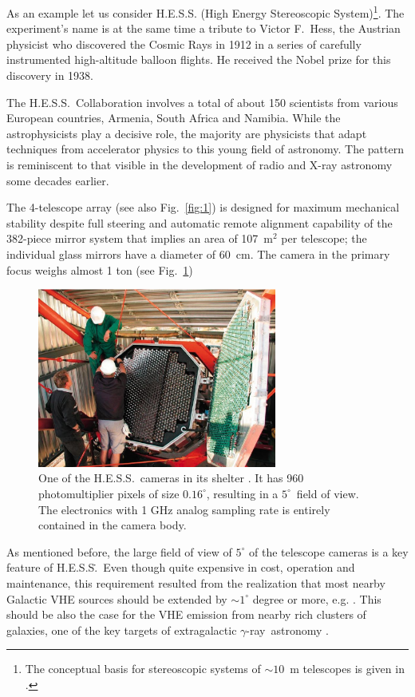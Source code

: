 \documentclass{svjour3x}                     %
\newcommand{\gr}{$\gamma$-ray}
\newcommand{\hess}{H.E.S.S.}
\begin{document}
As an example let us consider H.E.S.S. (High Energy Stereoscopic
System)\footnote{The conceptual basis for stereoscopic systems of $\sim 10$~m
  telescopes is given in \cite{AHKV97a,AHKV97b}.}. The experiment's name is at
the same time a tribute to Victor F.\ Hess, the Austrian physicist who
discovered the Cosmic Rays in 1912 in a series of carefully instrumented
high-altitude balloon flights. He received the Nobel prize for this discovery
in 1938.

The H.E.S.S.\ Collaboration involves a total of about 150 scientists from
various European countries, Armenia, South Africa and Namibia. While the
astrophysicists play a decisive role, the majority are physicists that adapt
techniques from accelerator physics to this young field of astronomy. The
pattern is reminiscent to that visible in the development of radio and X-ray
astronomy some decades earlier.

The 4-telescope array (see also Fig.~\ref{fig:1}) is designed for maximum
mechanical stability despite full steering and automatic remote alignment
capability of the 382-piece mirror system that implies an area of 
107~m$^2$ per telescope; the individual glass mirrors have a diameter of 
60~cm. The camera in the primary focus weighs almost 1 ton (see
Fig.~\ref{fig:12})

\begin{figure}\sidecaption
  \includegraphics[width=0.7\textwidth]{HESS_camera_x.eps}
  \caption[One of the \hess\ cameras]{One of the \hess\ cameras in its shelter \cite{hesspic}. It has 960
    photomultiplier pixels of size $0.16^{\circ}$, resulting in a
    $5^{\circ}$~field of view. The electronics with 1 GHz analog sampling rate
    is entirely contained in the camera body.}
  \label{fig:12}       %
\end{figure}


As mentioned before, the large field of view of $5^{\circ}$ of the telescope
cameras is a key feature of \hess\.~Even though quite expensive in cost,
operation and maintenance, this requirement resulted from the realization that
most nearby Galactic VHE sources should be extended by $\sim 1^{\circ}$ degree
or more, e.g. \cite{drury94}. This should be also the case for the VHE emission
from nearby rich clusters of galaxies, one of the key targets of extragalactic
\gr\ astronomy \cite{voelk96}.
\end{document}
